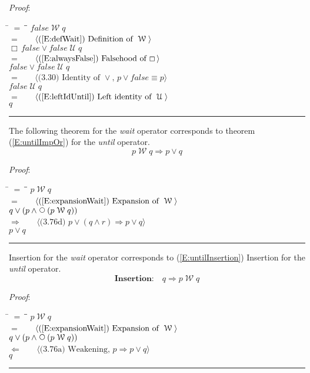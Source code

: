 \documentclass[12pt, fleqn, leqno]{article}
\newcommand{\lgap}{2pt}                             %
\newcommand{\mymathindent}{24pt}                    %
\newcommand{\impl}{\ensuremath{\Rightarrow}}        %
\newcommand{\foll}{\ensuremath{\Leftarrow}}         %
\newcommand{\Until}{\;\mathcal{U}\;}
\newcommand{\Wait}{\;\mathcal{W}\;}
\newcommand{\Next}{\;\,\text{\raisebox{3.5pt}{\circle{6}}}}
\newcommand{\Always}{\Box\,}
\newcommand{\myqed}{\rule[-.23ex]{1.2ex}{2.0ex}}
\newcommand{\myqedtab}{\hspace{384pt}}              %
\newcommand{\Gll} {\langle}                         %
\newcommand{\Ggg} {\rangle}                         %
\newcommand{\Hint}[1]     {\ \ \ $\Gll              \mbox{#1} \Ggg$ }   %
\begin{document}
\emph{Proof}:
\begin{tabbing}
\hspace{\mymathindent} \= $= \;$ \= \myqedtab \= \kill
\> \> $false \Wait q$\\[\lgap]
\> $=$ \> \Hint{(\ref{E:defWait}) Definition of $\Wait$} \\[\lgap]
\> \> $\Always false \lor false\Until q$\\[\lgap]
\> $=$ \> \Hint{(\ref{E:alwaysFalse}) Falsehood of $\Always$} \\[\lgap]
\> \> $false \lor false\Until q$\\[\lgap]
\> $=$ \> \Hint{(3.30) Identity of $\lor$, $p\lor false\equiv p$} \\[\lgap]
\> \> $false\Until q$\\[\lgap]
\> $=$ \> \Hint{(\ref{E:leftIdUntil}) Left identity of $\Until$}\\[\lgap]
\> \> $q$ \quad \myqed
\end{tabbing}

The following theorem for the \textit{wait} operator corresponds to theorem (\ref{E:untilImpOr}) for the \textit{until} operator.
\begin{equation}\label{E:waitToOr}
p \Wait q \impl p \lor q
\end{equation}

\emph{Proof}:
\begin{tabbing}
\hspace{\mymathindent} \= $= \;$ \= \myqedtab \= \kill
\> \> $p \Wait q$\\[\lgap]
\> $=$ \> \Hint{(\ref{E:expansionWait}) Expansion of $\Wait$} \\[\lgap]
\> \> $q \lor (p \land \Next(p \Wait q))$\\[\lgap]
\> $\impl$ \> \Hint{(3.76d) $p\lor (q\land r) \impl p\lor q$} \\[\lgap]
\> \> $p \lor q$ \quad \myqed
\end{tabbing}

Insertion for the \textit{wait} operator corresponds to
(\ref{E:untilInsertion}) Insertion for the \textit{until} operator.
\begin{equation}\label{E:waitInsertion}
\textbf{Insertion:}\quad q \impl p \Wait q
\end{equation}

\emph{Proof}:
\begin{tabbing}
\hspace{\mymathindent} \= $= \;$ \= \myqedtab \= \kill
\> \> $p \Wait q$\\[\lgap]
\> $=$ \> \Hint{(\ref{E:expansionWait}) Expansion of $\Wait$} \\[\lgap]
\> \> $q \lor (p \land \Next(p \Wait q))$\\[\lgap]
\> $\foll$ \> \Hint{(3.76a) Weakening, $p\impl p\lor q$} \\[\lgap]
\> \> $q$ \quad \myqed
\end{tabbing}
\end{document}
